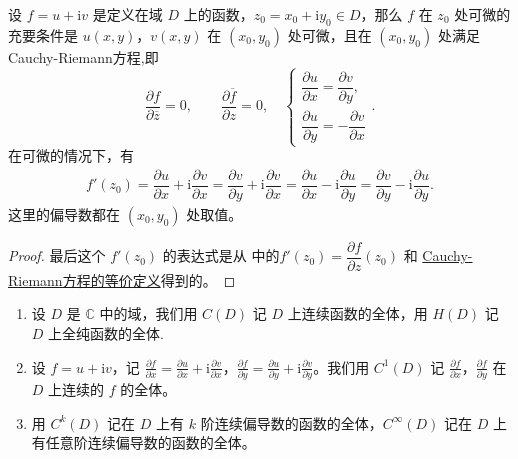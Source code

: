 \documentclass[../../main.tex]{subfiles}
\begin{document}
\begin{theorem}\label{theorem:复变函数可微的充要条件2}
设 \( f = u + \mathrm{i}v \) 是定义在域 \( D \) 上的函数，\( z_0 = x_0 + \mathrm{i}y_0 \in D \)，那么 \( f \) 在 \( z_0 \) 处可微的充要条件是 \( u(x, y) \)，\( v(x, y) \) 在 \( (x_0, y_0) \) 处可微，且在 \( (x_0, y_0) \) 处满足Cauchy-Riemann方程,即
\[
\frac{\partial f}{\partial \overline{z}} = 0,\quad \quad \frac{\partial \overline{f}}{\partial z}=0,\quad \begin{cases}
\dfrac{\partial u}{\partial x} = \dfrac{\partial v}{\partial y}, \\
\dfrac{\partial u}{\partial y} = -\dfrac{\partial v}{\partial x}
\end{cases}.
\]
在可微的情况下，有
\begin{align*}
f'(z_0) = \dfrac{\partial u}{\partial x} + \mathrm{i}\dfrac{\partial v}{\partial x}
= \dfrac{\partial v}{\partial y} + \mathrm{i}\dfrac{\partial v}{\partial x} = \dfrac{\partial u}{\partial x} - \mathrm{i}\dfrac{\partial u}{\partial y} = \dfrac{\partial v}{\partial y} - \mathrm{i}\dfrac{\partial u}{\partial y}.
\end{align*}
这里的偏导数都在 \( (x_0, y_0) \) 处取值。
\end{theorem}
\begin{proof}
最后这个 \( f'(z_0) \) 的表达式是从 中的\( f'(z_0) = \dfrac{\partial f}{\partial z}(z_0) \) 和 \hyperref[proposition:Cauchy-Riemann方程的等价定义]{Cauchy-Riemann方程的等价定义}得到的。
\end{proof}

\begin{definition}
\begin{enumerate}
\item 设 \( D \) 是 \( \mathbb{C} \) 中的域，我们用 \( C(D) \) 记 \( D \) 上连续函数的全体，用 \( H(D) \) 记 \( D \) 上全纯函数的全体.

\item 设 \( f = u + \mathrm{i}v \)，记 \( \frac{\partial f}{\partial x} = \frac{\partial u}{\partial x} + \mathrm{i}\frac{\partial v}{\partial x} \)，\( \frac{\partial f}{\partial y} = \frac{\partial u}{\partial y} + \mathrm{i}\frac{\partial v}{\partial y} \)。我们用 \( C^1(D) \) 记 \( \frac{\partial f}{\partial x} \)，\( \frac{\partial f}{\partial y} \) 在 \( D \) 上连续的 \( f \) 的全体。

\item 用 \( C^k(D) \) 记在 \( D \) 上有 \( k \) 阶连续偏导数的函数的全体，\( C^\infty(D) \) 记在 \( D \) 上有任意阶连续偏导数的函数的全体。
\end{enumerate}
\end{definition}
\end{document}

